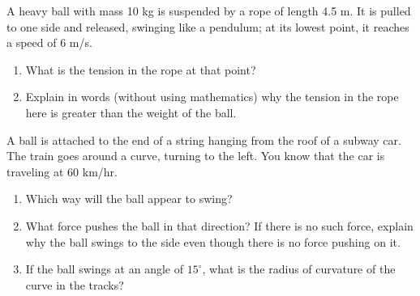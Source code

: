 \documentclass[12pt]{article}
\begin{document}
\begin{enumerate}
\begin{enumerate}
\end{enumerate}




\newpage
\item A heavy ball with mass 10 kg is suspended by a rope of length 4.5 m. It is pulled to one side and released, swinging like
a pendulum; at its lowest point, it reaches a speed of 6 m/s. 

\begin{enumerate}
	\item What is the tension in the rope at that point?
	\item Explain in words (without using mathematics) why the tension in the rope here is greater than the weight of the ball.
\end{enumerate}

\bigskip

\item A ball is attached to the end of a string hanging from the roof of a subway car. 
The train goes around a curve, turning to the left. You know that the car is traveling at 60 km/hr.

\begin{enumerate}
	\item Which way will the ball appear to swing?
	\item What force pushes the ball in that direction? If there is no such force, explain why the ball swings to the side even though there is no force pushing on it.
	\item If the ball swings at an angle of $15^\circ$, what is the radius of curvature of the curve in the tracks?
\end{enumerate}

\begin{minipage}[t]{0.6\textwidth}
	\item 
	

\end{minipage}
\end{enumerate}
\end{document}
